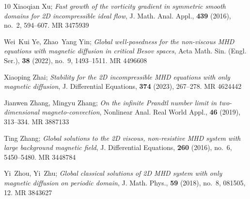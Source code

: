 \documentclass[reqno]{amsart}
\begin{document}
\begin{thebibliography}{10}
Xiaoqian Xu; 
\emph{Fast growth of the vorticity gradient in symmetric smooth
 domains for 2{D} incompressible ideal flow}, J. Math. Anal. Appl.,
 \textbf{439} (2016), no.~2, 594--607. MR {3475939}

Wei~Kui Ye, Zhao~Yang Yin; 
\emph{Global well-posedness for the non-viscous
 {MHD} equations with magnetic diffusion in critical {B}esov spaces}, Acta
 Math. Sin. (Engl. Ser.), \textbf{38} (2022), no.~9, 1493--1511. MR {4496608}

Xiaoping Zhai; 
\emph{Stability for the 2{D} incompressible {MHD} equations with
 only magnetic diffusion}, J. Differential Equations, \textbf{374} (2023),
 267--278. MR {4624442}

Jianwen Zhang, Mingyu Zhang; 
\emph{On the infinite {P}randtl number limit in
 two-dimensional magneto-convection}, Nonlinear Anal. Real World Appl.,
 \textbf{46} (2019), 313--334. MR {3887133}

Ting Zhang; 
\emph{Global solutions to the 2{D} viscous, non-resistive {MHD}
system with large background magnetic field}, J. Differential Equations,
\textbf{260} (2016), no.~6, 5450--5480. MR {3448784}

Yi~Zhou, Yi~Zhu; 
\emph{Global classical solutions of 2{D} {MHD} system with
 only magnetic diffusion on periodic domain}, J. Math. Phys., \textbf{59}
 (2018), no.~8, 081505, 12. MR {3843627}

\end{thebibliography}
\end{document}
